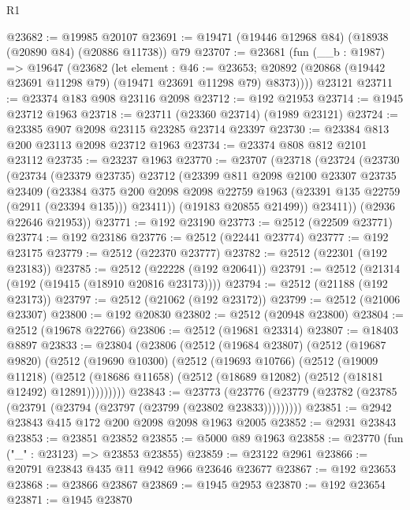 \begin{lexlean}{R1}
\begin{coremodule}
@23682 := @19985 @20107
@23691 := @19471 (@19446 @12968 @84) (@18938 (@20890 @84) (@20886 @11738)) @79
@23707 := @23681
    (fun (__b : @1987) =>
    @19647
      (@23682
        (let element : @46 := @23653;
        @20892 (@20868 (@19442 @23691 @11298 @79) (@19471 @23691 @11298 @79) @8373))))
    @23121
@23711 := @23374 @183 @908 @23116 @2098
@23712 := @192 @21953
@23714 := @1945 @23712 @1963
@23718 := @23711 (@23360 @23714) (@1989 @23121)
@23724 := @23385 @907 @2098 @23115 @23285 @23714 @23397
@23730 := @23384 @813 @200 @23113 @2098 @23712 @1963
@23734 := @23374 @808 @812 @2101 @23112
@23735 := @23237 @1963
@23770 := @23707
    (@23718
      (@23724
        (@23730
          (@23734
            (@23379 @23735)
            @23712
            (@23399
              @811
              @2098
              @2100
              @23307
              @23735
              @23409
              (@23384
                @375
                @200
                @2098
                @2098
                @22759
                @1963
                (@23391 @135 @22759 (@2911 (@23394 @135)))
                @23411))
            (@19183 @20855 @21499))
          @23411))
      (@2936 @22646 @21953))
@23771 := @192 @23190
@23773 := @2512 (@22509 @23771)
@23774 := @192 @23186
@23776 := @2512 (@22441 @23774)
@23777 := @192 @23175
@23779 := @2512 (@22370 @23777)
@23782 := @2512 (@22301 (@192 @23183))
@23785 := @2512 (@22228 (@192 @20641))
@23791 := @2512 (@21314 (@192 (@19415 (@18910 @20816 @23173))))
@23794 := @2512 (@21188 (@192 @23173))
@23797 := @2512 (@21062 (@192 @23172))
@23799 := @2512 (@21006 @23307)
@23800 := @192 @20830
@23802 := @2512 (@20948 @23800)
@23804 := @2512 (@19678 @22766)
@23806 := @2512 (@19681 @23314)
@23807 := @18403 @8897
@23833 := @23804
    (@23806
      (@2512
        (@19684 @23807)
        (@2512
          (@19687 @9820)
          (@2512
            (@19690 @10300)
            (@2512
              (@19693 @10766)
              (@2512
                (@19009 @11218)
                (@2512 (@18686 @11658) (@2512 (@18689 @12082) (@2512 (@18181 @12492) @12891)))))))))
@23843 := @23773
    (@23776 (@23779 (@23782 (@23785 (@23791 (@23794 (@23797 (@23799 (@23802 @23833)))))))))
@23851 := @2942 @23843 @415 @172 @200 @2098 @2098 @1963 @2005
@23852 := @2931 @23843
@23853 := @23851 @23852
@23855 := @5000 @89 @1963
@23858 := @23770 (fun ("_" : @23123) => @23853 @23855)
@23859 := @23122 @2961
@23866 := @20791 @23843 @435 @11 @942 @966 @23646 @23677
@23867 := @192 @23653
@23868 := @23866 @23867
@23869 := @1945 @2953
@23870 := @192 @23654
@23871 := @1945 @23870

\end{coremodule}
\end{lexlean}
